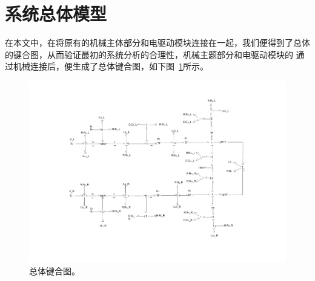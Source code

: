 \clearpage
\section{系统总体模型}

在本文中，在将原有的机械主体部分和电驱动模块连接在一起，我们便得到了总体的键合图，从而验证最初的系统分析的合理性，机械主题部分和电驱动模块的
通过机械连接后，便生成了总体键合图，如下图~\ref{fig:overall}所示。

\begin{figure}[!h]
	\centering
	\includegraphics[width=1.25\textwidth,angle=90]{fig/overall.pdf}
	\caption{总体键合图。}\label{fig:overall}
\end{figure}
